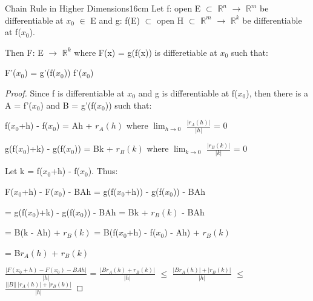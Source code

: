     \newpage



    \begin{wtheorem}{Chain Rule in Higher Dimensions}{16cm}
        Let f: open E $\subset$ $\mathbb{R}^n$ $\rightarrow$ $\mathbb{R}^m$
        be differentiable at $x_0$ $\in$ E and
        g: f(E) $\subset$ open H $\subset$ $\mathbb{R}^m$ $\rightarrow$
        $\mathbb{R}^k$ be differentiable at f($x_0$).
        
        Then F: E $\rightarrow$ $\mathbb{R}^k$ where F(x) = g(f(x))
        is differetiable at $x_0$ such that:

        \hspace{0.5cm}
        F'($x_0$) = g'(f($x_0$)) f'($x_0$)
    \end{wtheorem}

    \begin{proof}
        Since f is differentiable at $x_0$ and g is differentiable at f($x_0$),
        then there is a A = f'($x_0$) and B = g'(f($x_0$)) such that:

        \hspace{0.5cm}
        f($x_0$+h) - f($x_0$)
        = Ah + $r_A(h)$
        \hspace{2cm}
        where $\lim_{h \rightarrow 0}$ $\frac{|r_A(h)|}{|h|}$ = 0

        \hspace{0.5cm}
        g(f($x_0$)+k) - g(f($x_0$))
        = Bk + $r_B(k)$
        \hspace{1cm}
        where $\lim_{k \rightarrow 0}$ $\frac{|r_B(k)|}{|k|}$ = 0

        Let k = f($x_0$+h) - f($x_0$). Thus:

        \hspace{0.5cm}
        F($x_0$+h) - F($x_0$) - BAh
        = g(f($x_0$+h)) - g(f($x_0$)) - BAh

        \hspace{4.8cm}
        = g(f($x_0$)+k) - g(f($x_0$)) - BAh
        = Bk + $r_B(k)$ - BAh

        \hspace{4.8cm}
        = B(k - Ah) + $r_B(k)$
        = B(f($x_0$+h) - f($x_0$) - Ah) + $r_B(k)$

        \hspace{4.8cm}
        = B$r_A(h)$ + $r_B(k)$

        \hspace{0.5cm}
        $\frac{|F(x_0+h) - F(x_0) - BAh|}{|h|}$
        = $\frac{|Br_A(h) + r_B(k)|}{|h|}$
        $\leq$ $\frac{|Br_A(h)| + |r_B(k)|}{|h|}$
        $\leq$ $\frac{||B|| \ |r_A(h)| + |r_B(k)|}{|h|}$


\end{proof}
